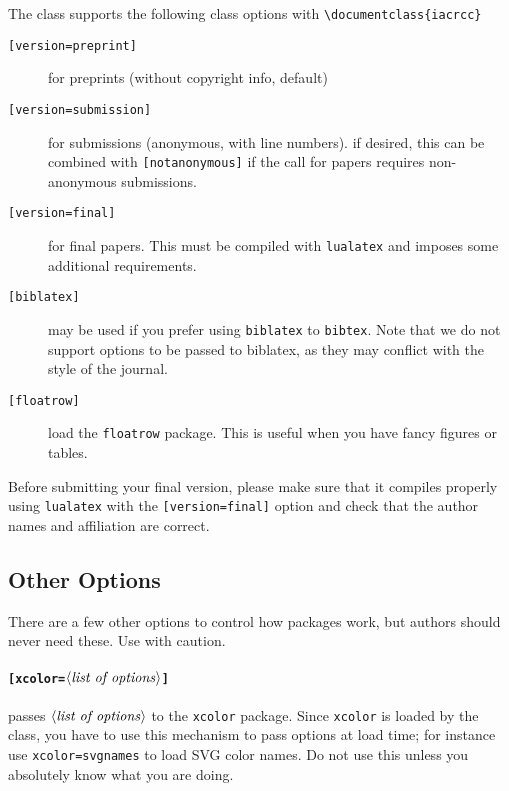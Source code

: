 \documentclass{iacrcc}
\begin{document}
The class supports the following class options with \verb+\documentclass{iacrcc}+
\begin{description}
\item[\texttt{[version=preprint]}] for preprints (without copyright info, default)
\item[\texttt{[version=submission]}] for submissions (anonymous, with
  line numbers).  if desired, this can be combined with
  \texttt{[notanonymous]} if the call for papers requires
  non-anonymous submissions.
\item[\texttt{[version=final]}] for final papers. This must be
  compiled with \texttt{lualatex} and imposes some additional
  requirements.
\item[\texttt{[biblatex]}] may be used if you prefer using
  \texttt{biblatex} to \texttt{bibtex}. Note that we do not support options to be
  passed to biblatex, as they may conflict with the style of the journal.
\item[\texttt{[floatrow]}] load the \texttt{floatrow} package. This is useful
  when you have fancy figures or tables.
\end{description}

Before submitting your final version, please make sure that it compiles
properly using \texttt{lualatex} with the \texttt{[version=final]} option
and check that the author names and affiliation are
correct.

\subsection{Other Options}
There are a few other options to control how packages work, but authors should never
need these. Use with caution.

\paragraph{\texttt{[xcolor=$\langle\text{\emph{list of options}}\rangle$]}}
  passes $\langle\text{\emph{list of options}}\rangle$ to
the \texttt{xcolor} package.  Since \texttt{xcolor} is loaded by the
class, you have to use this mechanism to pass options at load time;
for instance use \texttt{xcolor=svgnames} to load SVG color names. Do
not use this unless you absolutely know what you are doing.
\end{document}
